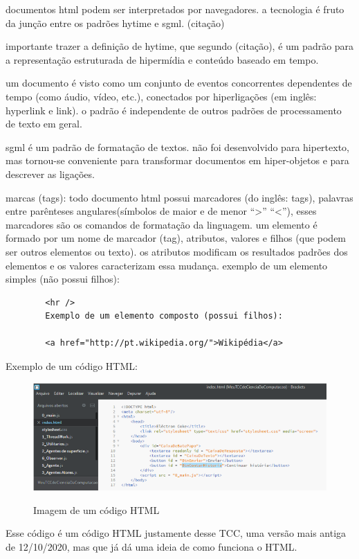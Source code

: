	documentos html podem ser interpretados por navegadores. a tecnologia é fruto da junção  entre os padrões hytime e sgml. (citação) 	
		
	importante trazer a definição de hytime, que segundo (citação),  é um padrão para a representação estruturada de hipermídia e conteúdo baseado em tempo.
	
	um documento é visto como um conjunto de eventos concorrentes dependentes de tempo (como áudio, vídeo, etc.), conectados por hiperligações (em inglês: hyperlink e link). o padrão é independente de outros padrões de processamento de texto em geral. 
	
	sgml é um padrão de formatação de textos. não foi desenvolvido para hipertexto, mas tornou-se  conveniente para transformar documentos em hiper-objetos e para descrever as ligações. 	
	
	marcas (tags): todo documento html possui marcadores (do inglês: tags), palavras entre parênteses angulares(símbolos de maior e de menor “>” “<”), esses marcadores são os comandos de formatação da linguagem. um elemento é formado por um nome de marcador (tag), atributos, valores e filhos (que podem ser outros elementos ou texto). os atributos modificam os resultados padrões dos elementos e os valores caracterizam essa mudança. exemplo de um elemento simples (não possui filhos): 
	
	\begin{verbatim}	
		<hr /> 
		Exemplo de um elemento composto (possui filhos): 
		
		<a href="http://pt.wikipedia.org/">Wikipédia</a> 	
	\end{verbatim}
	Exemplo de um código HTML:		
	\begin{figure}[H]
		\centering
		\caption{Imagem de um código HTML}
		\centering
		\includegraphics[scale=0.75]{./images/Figure_5}	
		\label{fig:Fig5} 
	\end{figure}	
	Esse código é um código HTML justamente desse TCC, uma versão mais antiga de 12/10/2020, mas que já dá uma ideia de como funciona o HTML.
	
